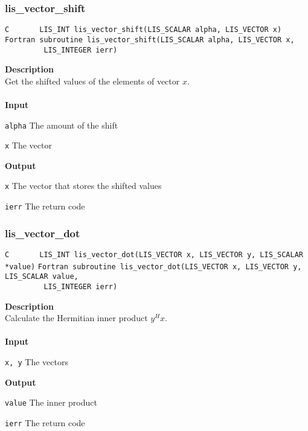 \documentclass[a4paper]{article}
\newcommand{\namelistlabel}[1]{\mbox{#1}\hfill}
\newenvironment{namelist}[1]{%
\begin{list}{}
  {\let\makelabel\namelistlabel
  \settowidth{\labelwidth}{#1}
  \setlength{\leftmargin}{1.1\labelwidth}}
  }{%
\end{list}}
\begin{document}
\subsubsection{lis\_vector\_shift}
\begin{screen}
\verb|C       LIS_INT lis_vector_shift(LIS_SCALAR alpha, LIS_VECTOR x)|\\
\verb|Fortran subroutine lis_vector_shift(LIS_SCALAR alpha, LIS_VECTOR x,|\\
\verb|         LIS_INTEGER ierr)|
\end{screen}
{\bf Description}\\
\indent
Get the shifted values of the elements of vector $x$.
\\ \\
\noindent
{\bf Input}
\begin{namelist}{XXXXXXXXXXXXXXXXXXXX}
\item[\tt alpha] The amount of the shift
\item[\tt x] The vector
\end{namelist}
{\bf Output}
\begin{namelist}{XXXXXXXXXXXXXXXXXXXX}
\item[\tt x] The vector that stores the shifted values
\item[\tt ierr] The return code
\end{namelist}

\newpage
\subsubsection{lis\_vector\_dot}
\begin{screen}
\verb|C       LIS_INT lis_vector_dot(LIS_VECTOR x, LIS_VECTOR y, LIS_SCALAR *value)|
\verb|Fortran subroutine lis_vector_dot(LIS_VECTOR x, LIS_VECTOR y, LIS_SCALAR value,|\\
\verb|         LIS_INTEGER ierr)|
\end{screen}
{\bf Description}\\
\indent
Calculate the Hermitian inner product $y^{H}x$.
\\ \\
\noindent
{\bf Input}
\begin{namelist}{XXXXXXXXXXXXXXXXXXXX}
\item[\tt x, y] The vectors
\end{namelist}
{\bf Output}
\begin{namelist}{XXXXXXXXXXXXXXXXXXXX}
\item[\tt value] The inner product
\item[\tt ierr] The return code
\end{namelist}
\end{document}

